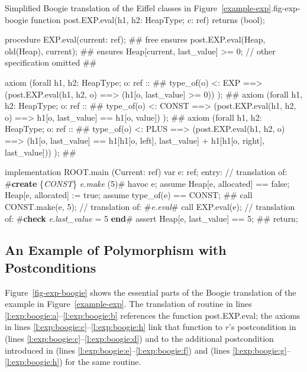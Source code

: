 \begin{bfigure}[p]{Simplified Boogie translation of the Eiffel classes in Figure~\ref{example-exp}.}{fig-exp-boogie}
function post.EXP.eval(h1, h2: HeapType; c: ref) returns (bool);

procedure EXP.eval(current: ref); #\label{l:exp:boogie:a}#
	free ensures post.EXP.eval(Heap, old(Heap), current); #\label{l:exp:boogie:k}#
	ensures Heap[current, last_value] >= 0;
	// other specification omitted #\label{l:exp:boogie:b}#

axiom (forall h1, h2: HeapType; o: ref :: #\label{l:exp:boogie:c}#
	type_of(o) <: EXP ==> 
	(post.EXP.eval(h1, h2, o) ==> (h1[o, last_value] >= 0)) ); #\label{l:exp:boogie:d}#
axiom (forall h1, h2: HeapType; o: ref :: #\label{l:exp:boogie:e}#
	type_of(o) <: CONST ==> 
	(post.EXP.eval(h1, h2, o) ==> h1[o, last_value] == h1[o, value]) ); #\label{l:exp:boogie:f}#
axiom (forall h1, h2: HeapType; o: ref :: #\label{l:exp:boogie:g}#
	type_of(o) <: PLUS ==> 
	(post.EXP.eval(h1, h2, o) ==> (h1[o, last_value] == 
		h1[h1[o, left], last_value] + h1[h1[o, right], last_value])) ); #\label{l:exp:boogie:h}#

implementation ROOT.main (Current: ref) {
		var e: ref;
	entry:
		// translation of: #\textbf{create} \{\textit{CONST}\} \textit{e.make} (5)#
		havoc e;
		assume Heap[e, allocated] == false;
		Heap[e, allocated] := true;
		assume type_of(e) == CONST; #\label{l:exp:boogie:i}#
		call CONST.make(e, 5);
		// translation of: #\textit{e.eval}#
		call EXP.eval(e);
		// translation of: #\textbf{check} \textit{e.last\_value} = 5 \textbf{end}#
		assert Heap[e, last_value] == 5; #\label{l:exp:boogie:j}#
		return;
}
\end{bfigure} 



\subsection{An Example of Polymorphism with Postconditions}

Figure~\ref{fig-exp-boogie} shows the essential parts of the Boogie translation of the example in Figure~\ref{example-exp}. 
The translation of routine  in lines \ref{l:exp:boogie:a}--\ref{l:exp:boogie:b} references the function \b{post.EXP.eval}; the axioms in lines \ref{l:exp:boogie:c}--\ref{l:exp:boogie:h} link that function to $r$'s postcondition in  (lines \ref{l:exp:boogie:c}--\ref{l:exp:boogie:d}) and to the additional postcondition introduced in  (lines \ref{l:exp:boogie:e}--\ref{l:exp:boogie:f}) and  (lines \ref{l:exp:boogie:g}--\ref{l:exp:boogie:h}) for the same routine.

